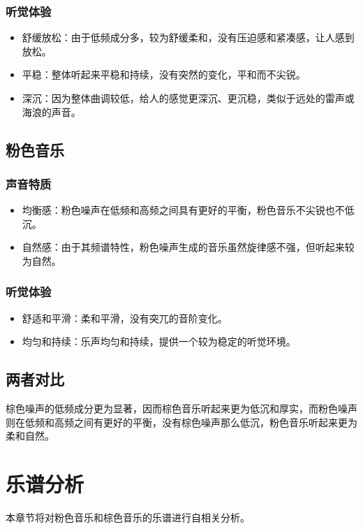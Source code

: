 \documentclass[a4paper,12pt]{article} %
\begin{document}
\subsubsection{听觉体验}
\begin{itemize}
    \item 舒缓放松：由于低频成分多，较为舒缓柔和，没有压迫感和紧凑感，让人感到放松。
    \item 平稳：整体听起来平稳和持续，没有突然的变化，平和而不尖锐。
    \item 深沉：因为整体曲调较低，给人的感觉更深沉、更沉稳，类似于远处的雷声或海浪的声音。
\end{itemize}

\subsection{粉色音乐}

\subsubsection{声音特质}
\begin{itemize}
    \item 均衡感：粉色噪声在低频和高频之间具有更好的平衡，粉色音乐不尖锐也不低沉。
    \item 自然感：由于其频谱特性，粉色噪声生成的音乐虽然旋律感不强，但听起来较为自然。
\end{itemize}

\subsubsection{听觉体验}
\begin{itemize}
    \item 舒适和平滑：柔和平滑，没有突兀的音阶变化。
    \item 均匀和持续：乐声均匀和持续，提供一个较为稳定的听觉环境。
\end{itemize}

\subsection{两者对比}
棕色噪声的低频成分更为显著，因而棕色音乐听起来更为低沉和厚实，而粉色噪声则在低频和高频之间有更好的平衡，没有棕色噪声那么低沉，粉色音乐听起来更为柔和自然。

\section{乐谱分析}\label{ptxvsx86}
本章节将对粉色音乐和棕色音乐的乐谱进行自相关分析。\par
\end{document}
